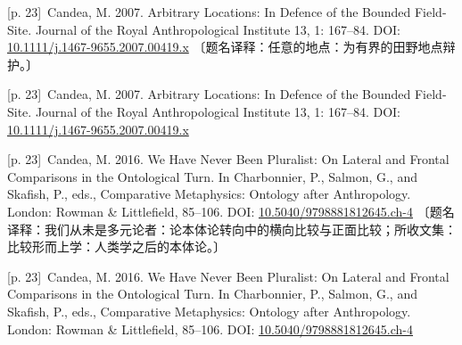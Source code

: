 \documentclass[10pt,a4paper]{article}
\begin{document}
\noindent\begin{minipage}{\textwidth}\begin{minipage}[t]{\dimexpr.5\textwidth-4mm\relax}\noindent\begin{minipage}[t]{\linewidth}{\scriptsize\color{gray} [p. 23]}\ Candea, M. 2007. Arbitrary Locations: In Defence of the Bounded Field-Site. Journal of the Royal Anthropological Institute 13, 1: 167–84. DOI: \url{10.1111/j.1467-9655.2007.00419.x} 〔题名译释：任意的地点：为有界的田野地点辩护。〕\par\end{minipage}\par\end{minipage}\hfill\begin{minipage}[t]{\dimexpr.5\textwidth-4mm\relax}\noindent\begin{minipage}[t]{\linewidth}{\scriptsize\color{gray} [p. 23]}\ Candea, M. 2007. Arbitrary Locations: In Defence of the Bounded Field-Site. Journal of the Royal Anthropological Institute 13, 1: 167–84. DOI: \url{10.1111/j.1467-9655.2007.00419.x}\par\end{minipage}\par\end{minipage}\end{minipage}\par
\noindent\begin{minipage}{\textwidth}\begin{minipage}[t]{\dimexpr.5\textwidth-4mm\relax}\noindent\begin{minipage}[t]{\linewidth}{\scriptsize\color{gray} [p. 23]}\ Candea, M. 2016. We Have Never Been Pluralist: On Lateral and Frontal Comparisons in the Ontological Turn. In Charbonnier, P., Salmon, G., and Skafish, P., eds., Comparative Metaphysics: Ontology after Anthropology. London: Rowman \& Littlefield, 85–106. DOI: \url{10.5040/9798881812645.ch-4} 〔题名译释：我们从未是多元论者：论本体论转向中的横向比较与正面比较；所收文集：比较形而上学：人类学之后的本体论。〕\par\end{minipage}\par\end{minipage}\hfill\begin{minipage}[t]{\dimexpr.5\textwidth-4mm\relax}\noindent\begin{minipage}[t]{\linewidth}{\scriptsize\color{gray} [p. 23]}\ Candea, M. 2016. We Have Never Been Pluralist: On Lateral and Frontal Comparisons in the Ontological Turn. In Charbonnier, P., Salmon, G., and Skafish, P., eds., Comparative Metaphysics: Ontology after Anthropology. London: Rowman \& Littlefield, 85–106. DOI: \url{10.5040/9798881812645.ch-4}\par\end{minipage}\par\end{minipage}\end{minipage}\par
\end{document}
